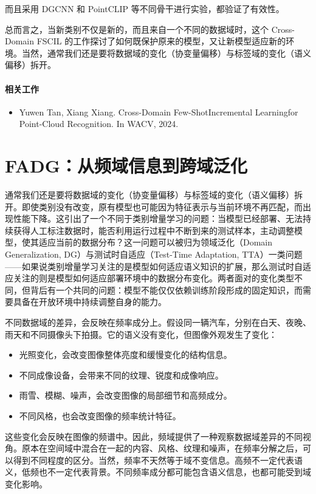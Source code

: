 而且采用 DGCNN 和 PointCLIP 等不同骨干进行实验，都验证了有效性。

总而言之，当新类别不仅是新的，而且来自一个不同的数据域时，这个 Cross-Domain FSCIL 的工作探讨了如何既保护原来的模型，又让新模型适应新的环境。当然，通常我们还是要将数据域的变化（协变量偏移）与标签域的变化（语义偏移）拆开。

\paragraph{相关工作}

\begin{itemize}
  \item Yuwen Tan, Xiang Xiang. Cross-Domain Few-ShotIncremental Learningfor Point-Cloud Recognition. In WACV, 2024.
\end{itemize}

\section{FADG：从频域信息到跨域泛化}

通常我们还是要将数据域的变化（协变量偏移）与标签域的变化（语义偏移）拆开。即使类别没有改变，原有模型也可能因为特征表示与当前环境不再匹配，而出现性能下降。这引出了一个不同于类别增量学习的问题：当模型已经部署、无法持续获得人工标注数据时，能否利用运行过程中不断到来的测试样本，主动调整模型，使其适应当前的数据分布？这一问题可以被归为领域泛化（Domain Generalization, DG）与测试时自适应（Test-Time Adaptation, TTA）一类问题——如果说类别增量学习关注的是模型如何适应语义知识的扩展，那么测试时自适应关注的则是模型如何适应部署环境中的数据分布变化。两者面对的变化类型不同，但背后有一个共同的问题：模型不能仅仅依赖训练阶段形成的固定知识，而需要具备在开放环境中持续调整自身的能力。

不同数据域的差异，会反映在频率成分上。假设同一辆汽车，分别在白天、夜晚、雨天和不同摄像头下拍摄。它的语义没有变化，但图像外观发生了变化：

\begin{itemize}
  \item 光照变化，会改变图像整体亮度和缓慢变化的结构信息。
  \item 不同成像设备，会带来不同的纹理、锐度和成像响应。
  \item 雨雪、模糊、噪声，会改变图像的局部细节和高频成分。
  \item 不同风格，也会改变图像的频率统计特征。
\end{itemize}

这些变化会反映在图像的频谱中。因此，频域提供了一种观察数据域差异的不同视角。原本在空间域中混合在一起的内容、风格、纹理和噪声，在频率分解之后，可以得到不同程度的区分。当然，频率不天然等于域不变信息。高频不一定代表语义，低频也不一定代表背景。不同频率成分都可能包含语义信息，也都可能受到域变化影响。

